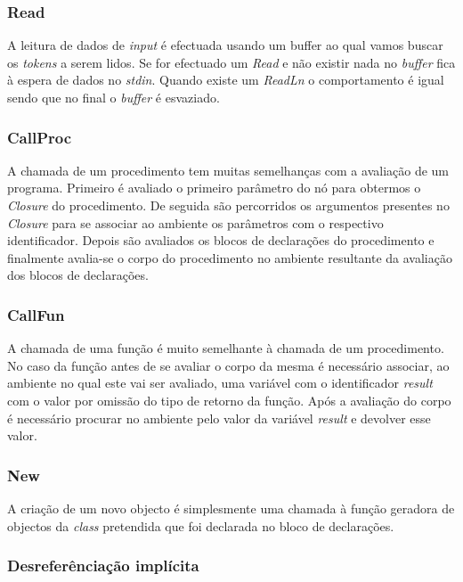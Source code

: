 \subsubsection{Read}

A leitura de dados de \emph{input} é efectuada usando um buffer ao qual vamos buscar os \emph{tokens} a serem lidos. Se for efectuado um \emph{Read} e não existir nada no \emph{buffer} fica à espera de dados no \emph{stdin}. Quando existe um \emph{ReadLn} o comportamento é igual sendo que no final o \emph{buffer} é esvaziado.

\subsubsection{CallProc}

A chamada de um procedimento tem muitas semelhanças com a avaliação de um programa. Primeiro é avaliado o primeiro parâmetro do nó para obtermos o \emph{Closure} do procedimento. De seguida são percorridos os argumentos presentes no \emph{Closure} para se associar ao ambiente os parâmetros com o respectivo identificador. Depois são avaliados os blocos de declarações do procedimento e finalmente avalia-se o corpo do procedimento no ambiente resultante da avaliação dos blocos de declarações.

\subsubsection{CallFun}

A chamada de uma função é muito semelhante à chamada de um procedimento. No caso da função antes de se avaliar o corpo da mesma é necessário associar, ao ambiente no qual este vai ser avaliado, uma variável com o identificador \emph{result} com o valor por omissão do tipo de retorno da função. Após a avaliação do corpo é necessário procurar no ambiente pelo valor da variável \emph{result} e devolver esse valor.

\subsubsection{New}

A criação de um novo objecto é simplesmente uma chamada à função geradora de objectos da \emph{class} pretendida que foi declarada no bloco de declarações.

\subsubsection{Desreferênciação implícita}

